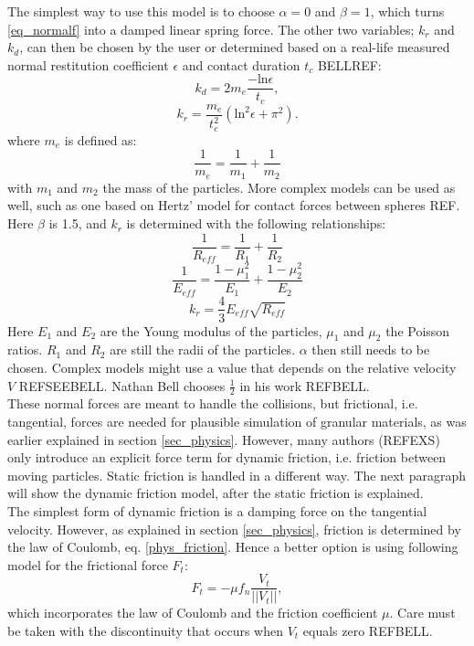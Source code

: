 The simplest way to use this model is to choose $\alpha = 0$ and $\beta = 1$, which turns \eqref{eq_normalf} into a damped linear spring force. The other two variables; $k_r$ and $k_d$, can then be chosen by the user or determined based on a real-life measured normal restitution coefficient $\epsilon$ and contact duration $t_c$ BELLREF:
\begin{equation}
k_d = 2 m_e \frac{- \mathrm{ln} \epsilon}{t_c},
\end{equation}
\begin{equation}
k_r =\frac{m_e}{t_c ^2} (\mathrm{ln}^2 \epsilon + \pi ^2).
\end{equation}
where $m_e$ is defined as:
\begin{equation}
\frac{1}{m_e} = \frac{1}{m_1} + \frac{1}{m_2}
\end{equation}
with $m_1$ and $m_2$ the mass of the particles. More complex models can be used as well, such as one based on Hertz' model for contact forces between spheres REF. Here $\beta$ is 1.5, and $k_r$ is determined with the following relationships:
\begin{equation}
\frac{1}{R_{eff}} = \frac{1}{R_1} + \frac{1}{R_2}
\end{equation}
\begin{equation}
\frac{1}{E_{eff}} = \frac{1 - \mu_{1}^2}{E_1} + \frac{1 - \mu_{2}^2}{E_2}
\end{equation}
\begin{equation}
k_r = \frac{4}{3} E_{eff} \sqrt{R_{eff}}
\end{equation}
Here $E_1$ and $E_2$ are the Young modulus of the particles, $\mu_1$ and $\mu_2$ the Poisson ratios. $R_1$ and $R_2$ are still the radii of the particles. $\alpha$ then still needs to be chosen. Complex models might use a value that depends on the relative velocity $V$ REFSEEBELL. Nathan Bell chooses $\frac{1}{2}$ in his work REFBELL.\\

These normal forces are meant to handle the collisions, but frictional, i.e. tangential, forces are needed for plausible simulation of granular materials, as was earlier explained in section \ref{sec_physics}. However, many authors (REFEXS) only introduce an explicit force term for dynamic friction, i.e. friction between moving particles. Static friction is handled in a different way. The next paragraph will show the dynamic friction model, after the static friction is explained.\\

The simplest form of dynamic friction is a damping force on the tangential velocity. However, as explained in section \ref{sec_physics}, friction is determined by the law of Coulomb, eq. \eqref{phys_friction}. Hence a better option is using following model for the frictional force $F_t$:
\begin{equation} \label{eq_bellDynamicFriction}
F_t = - \mu f_n \frac{V_t}{||V_t||},
\end{equation}
which incorporates the law of Coulomb and the friction coefficient $\mu$. Care must be taken with the discontinuity that occurs when $V_t$ equals zero REFBELL.\\

